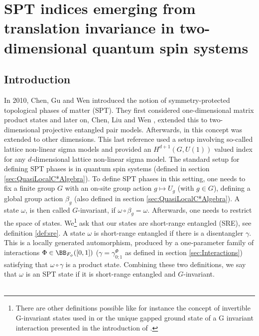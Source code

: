 \chapter{SPT indices emerging from translation invariance in two-dimensional quantum spin systems}\label{ch:TranslationSPT}
\section{Introduction}
In 2010, Chen, Gu and Wen \cite{chen_gu_wen_2011} introduced the notion of symmetry-protected topological phases of matter (SPT). They first considered one-dimensional matrix product states and later on, Chen, Liu and Wen \cite{Chen_2011}, extended this to two-dimensional projective entangled pair models. Afterwards, in \cite{Chen_2013} this concept was extended to other dimensions. This last reference used a setup involving so-called lattice non-linear sigma models and provided an $H^{d+1}(G,U(1))$ valued index for any $d$-dimensional lattice non-linear sigma model. The standard setup for defining SPT phases is in quantum spin systems (defined in section \ref{sec:QuasiLocalC*Algebra}). To define SPT phases in this setting, one needs to fix a finite group $G$ with an on-site group action $g\mapsto U_g$ (with $g\in G$), defining a global group action $\beta_g$ (also defined in section \ref{sec:QuasiLocalC*Algebra}). A state $\omega$, is then called $G$-invariant, if $\omega\circ\beta_g=\omega$. Afterwards, one needs to restrict the space of states. We\footnote{There are other definitions possible like for instance the concept of invertible G-invariant states used in \cite{kapustin2021classification} or the unique gapped ground state of a G invariant interaction presented in the introduction of \cite{Ogata2d}.} ask that our states are short-range entangled (SRE), see definition \ref{def:sre}. A state $\omega$ is short-range entangled if there is a disentangler $\gamma$. This is a locally generated automorphism, produced by a one-parameter family of interactions $\Phi\in\BB_{F_\phi}([0,1])$ ($\gamma=\gamma_{0;1}^\Phi$ as defined in section \ref{sec:Interactions}) satisfying that $\omega\circ\gamma$ is a product state. Combining these two definitions, we say that $\omega$ is an SPT state if it is short-range entangled and $G$-invariant.
\\\\
